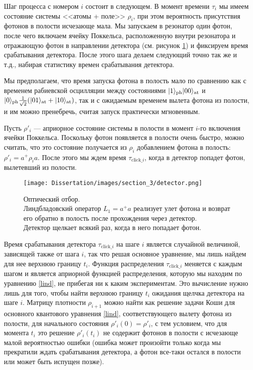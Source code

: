 Шаг процесса с номером $i$ состоит в следующем. В момент времени $\tau_{i}$ мы имеем состояние системы <<атомы + поле>> $\rho_{i}$, при этом вероятность присутствия фотонов в полости исчезающе мала. Мы запускаем в резонатор один фотон, после чего включаем ячейку Поккельса, расположенную внутри резонатора и отражающую фотон в направлении детектора (см. рисунок \ref{fig:2}) и фиксируем время срабатывания детектора. После этого шага делаем следующий точно так же и т.д., набирая статистику времен срабатывания детектора. 

Мы предполагаем, что время запуска фотона в полость мало по сравнению как с временем  рабиевской осцилляции между состояниями $|1\rangle_{\text{ph}}|00\rangle_{\text{at}}$ и $|0\rangle_{\text{ph}}\frac{1}{\sqrt 2}(|01\rangle_{\text{at}}+|10\rangle_{\text{at}})$, так и с ожидаемым временем вылета фотона из полости, и им можно пренебречь, считая запуск практически мгновенным.

Пусть $\rho'_{i}$ --- априорное состояние системы в полости в момент $i$-го включения ячейки Поккельса. Поскольку фотон появляется в полости очень быстро, можно считать, что это состояние получается из $\rho_i$ добавлением фотона в полость: $\rho'_i=a^+\rho_ia$. После этого мы ждем время $\tau_{\text{click}\_i}$, когда в детектор попадет фотон, вылетевший из полости. 

\begin{figure}[bt]
	\noindent\centering\texttt{[image: Dissertation/images/section\_3/detector.png]}
	\captionsetup{format=hang,width=0.85\textwidth,justification=centering,singlelinecheck=no}
	\caption{Оптический отбор.\\Линдбладовский оператор $L_{1} = a^{+}a$ реализует улет фотона и возврат его обратно в полость после прохождения через детектор.\\ Детектор щелкает всякий раз, когда в него попадает фотон.}
	\label{fig:2}
\end{figure}

Время срабатывания детектора $\tau_{\text{click}\_i}$ на шаге $i$ является случайной величиной, зависящей также от шага $i$, так что решая основное уравнение, мы лишь найдем для нее верхнюю границу $t_i$. Функция распределения $\tau_{\text{click}\_i}$ меняется с каждым шагом и является априорной функцией распределения, которую мы находим по уравнению \eqref{lind}, не прибегая ни к каким экспериментам. Это вычисление нужно лишь для того, чтобы найти верхнюю границу $t_i$ ожидания щелчка детектора на шаге $i$. Матрицу плотности $\rho_{i+1}$ можно найти как решение задачи Коши для основного квантового уравнения \eqref{lind}, соответствующего вылету фотона из полости, для начального состояния $\rho'_i(0)=\rho'_i$, с тем условием, что для момента $t_{i}$ это решение $\rho'_i(t_{i})$ не содержит фотонов в полости с исчезающе малой вероятностью ошибки  (ошибка может произойти только когда мы прекратили ждать срабатывания детектора, а фотон все-таки остался в полости или может быть испущен позже).

